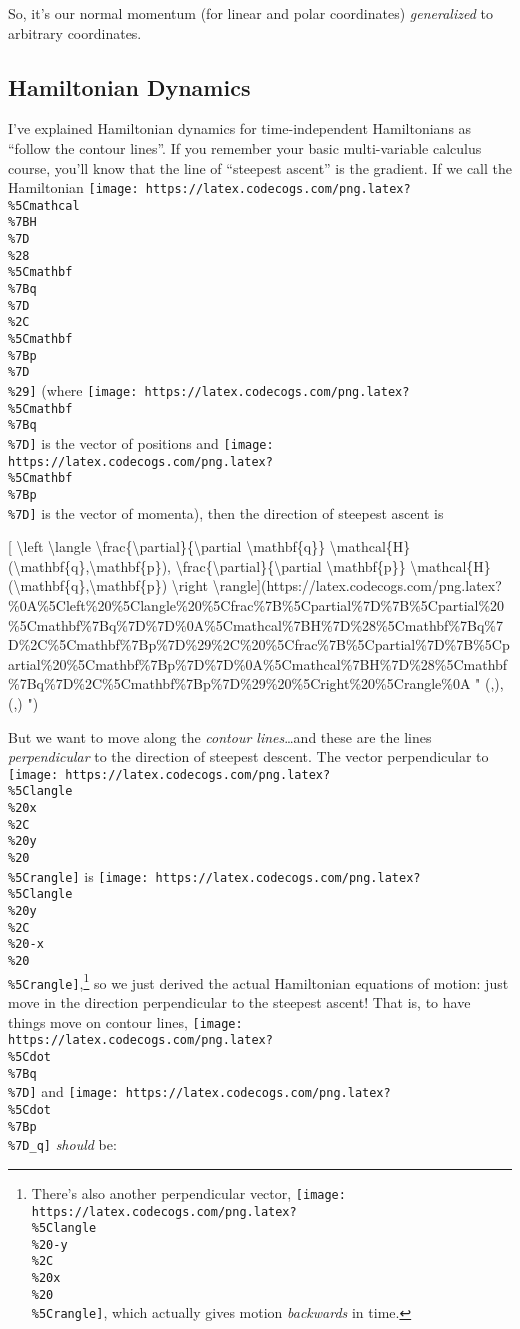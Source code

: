 \documentclass[]{article}
\begin{document}
So, it's our normal momentum (for linear and polar coordinates)
\emph{generalized} to arbitrary coordinates.

\hypertarget{hamiltonian-dynamics}{%
\subsection{Hamiltonian Dynamics}\label{hamiltonian-dynamics}}

I've explained Hamiltonian dynamics for time-independent Hamiltonians as
``follow the contour lines''. If you remember your basic multi-variable calculus
course, you'll know that the line of ``steepest ascent'' is the gradient. If we
call the Hamiltonian
\texttt{[image: https://latex.codecogs.com/png.latex?\\\%5Cmathcal\\\%7BH\\\%7D\\\%28\\\%5Cmathbf\\\%7Bq\\\%7D\\\%2C\\\%5Cmathbf\\\%7Bp\\\%7D\\\%29]}
(where
\texttt{[image: https://latex.codecogs.com/png.latex?\\\%5Cmathbf\\\%7Bq\\\%7D]} is
the vector of positions and
\texttt{[image: https://latex.codecogs.com/png.latex?\\\%5Cmathbf\\\%7Bp\\\%7D]} is
the vector of momenta), then the direction of steepest ascent is

{[} \textbackslash{}left \textbackslash{}langle
\textbackslash{}frac\{\textbackslash{}partial\}\{\textbackslash{}partial
\textbackslash{}mathbf\{q\}\}
\textbackslash{}mathcal\{H\}(\textbackslash{}mathbf\{q\},\textbackslash{}mathbf\{p\}),
\textbackslash{}frac\{\textbackslash{}partial\}\{\textbackslash{}partial
\textbackslash{}mathbf\{p\}\}
\textbackslash{}mathcal\{H\}(\textbackslash{}mathbf\{q\},\textbackslash{}mathbf\{p\})
\textbackslash{}right
\textbackslash{}rangle{]}(https://latex.codecogs.com/png.latex?\%0A\%5Cleft\%20\%5Clangle\%20\%5Cfrac\%7B\%5Cpartial\%7D\%7B\%5Cpartial\%20\%5Cmathbf\%7Bq\%7D\%7D\%0A\%5Cmathcal\%7BH\%7D\%28\%5Cmathbf\%7Bq\%7D\%2C\%5Cmathbf\%7Bp\%7D\%29\%2C\%20\%5Cfrac\%7B\%5Cpartial\%7D\%7B\%5Cpartial\%20\%5Cmathbf\%7Bp\%7D\%7D\%0A\%5Cmathcal\%7BH\%7D\%28\%5Cmathbf\%7Bq\%7D\%2C\%5Cmathbf\%7Bp\%7D\%29\%20\%5Cright\%20\%5Crangle\%0A
" \left \langle {}
(,), 
(,) \right \rangle ")

But we want to move along the \emph{contour lines}\ldots{}and these are the
lines \emph{perpendicular} to the direction of steepest descent. The vector
perpendicular to
\texttt{[image: https://latex.codecogs.com/png.latex?\\\%5Clangle\\\%20x\\\%2C\\\%20y\\\%20\\\%5Crangle]}
is
\texttt{[image: https://latex.codecogs.com/png.latex?\\\%5Clangle\\\%20y\\\%2C\\\%20-x\\\%20\\\%5Crangle]},\footnote{There's
  also another perpendicular vector,
  \texttt{[image: https://latex.codecogs.com/png.latex?\\\%5Clangle\\\%20-y\\\%2C\\\%20x\\\%20\\\%5Crangle]},
  which actually gives motion \emph{backwards} in time.} so we just derived the
actual Hamiltonian equations of motion: just move in the direction perpendicular
to the steepest ascent! That is, to have things move on contour lines,
\texttt{[image: https://latex.codecogs.com/png.latex?\\\%5Cdot\\\%7Bq\\\%7D]} and
\texttt{[image: https://latex.codecogs.com/png.latex?\\\%5Cdot\\\%7Bp\\\%7D\_q]}
\emph{should} be:
\end{document}
